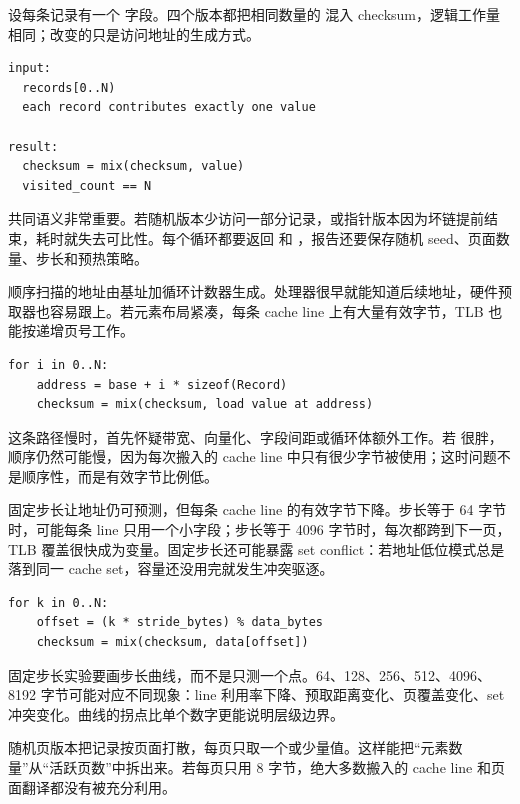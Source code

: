 设每条记录有一个  字段。四个版本都把相同数量的  混入 checksum，逻辑工作量相同；改变的只是访问地址的生成方式。

\begin{lstlisting}[numbers=none,caption={四条地址路径的共同语义}]
input:
  records[0..N)
  each record contributes exactly one value

result:
  checksum = mix(checksum, value)
  visited_count == N
\end{lstlisting}

共同语义非常重要。若随机版本少访问一部分记录，或指针版本因为坏链提前结束，耗时就失去可比性。每个循环都要返回  和 ，报告还要保存随机 seed、页面数量、步长和预热策略。

顺序扫描的地址由基址加循环计数器生成。处理器很早就能知道后续地址，硬件预取器也容易跟上。若元素布局紧凑，每条 cache line 上有大量有效字节，TLB 也能按递增页号工作。

\begin{lstlisting}[numbers=none,caption={顺序扫描的地址生成}]
for i in 0..N:
    address = base + i * sizeof(Record)
    checksum = mix(checksum, load value at address)
\end{lstlisting}

这条路径慢时，首先怀疑带宽、向量化、字段间距或循环体额外工作。若  很胖，顺序仍然可能慢，因为每次搬入的 cache line 中只有很少字节被使用；这时问题不是顺序性，而是有效字节比例低。

固定步长让地址仍可预测，但每条 cache line 的有效字节下降。步长等于 64 字节时，可能每条 line 只用一个小字段；步长等于 4096 字节时，每次都跨到下一页，TLB 覆盖很快成为变量。固定步长还可能暴露 set conflict：若地址低位模式总是落到同一 cache set，容量还没用完就发生冲突驱逐。

\begin{lstlisting}[numbers=none,caption={固定步长扫描}]
for k in 0..N:
    offset = (k * stride_bytes) % data_bytes
    checksum = mix(checksum, data[offset])
\end{lstlisting}

固定步长实验要画步长曲线，而不是只测一个点。64、128、256、512、4096、8192 字节可能对应不同现象：line 利用率下降、预取距离变化、页覆盖变化、set 冲突变化。曲线的拐点比单个数字更能说明层级边界。

随机页版本把记录按页面打散，每页只取一个或少量值。这样能把“元素数量”从“活跃页数”中拆出来。若每页只用 8 字节，绝大多数搬入的 cache line 和页面翻译都没有被充分利用。

